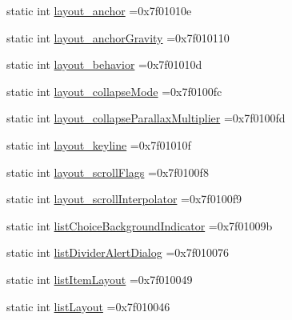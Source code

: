 \begin{DoxyCompactItemize}
\item 
static int \hyperlink{classandroid_1_1support_1_1graphics_1_1drawable_1_1animated_1_1R_1_1attr_a90a69ad17d119767331f4008913d0760}{layout\+\_\+anchor} =0x7f01010e
\item 
static int \hyperlink{classandroid_1_1support_1_1graphics_1_1drawable_1_1animated_1_1R_1_1attr_a21a34f7e65de6a6afbdcc5f751a1e730}{layout\+\_\+anchor\+Gravity} =0x7f010110
\item 
static int \hyperlink{classandroid_1_1support_1_1graphics_1_1drawable_1_1animated_1_1R_1_1attr_aca242dc21928e409955fbf7fc6e05b83}{layout\+\_\+behavior} =0x7f01010d
\item 
static int \hyperlink{classandroid_1_1support_1_1graphics_1_1drawable_1_1animated_1_1R_1_1attr_a310c79529b4bf2e08644eaf211b0722a}{layout\+\_\+collapse\+Mode} =0x7f0100fc
\item 
static int \hyperlink{classandroid_1_1support_1_1graphics_1_1drawable_1_1animated_1_1R_1_1attr_a6ed7dc564c15ce0ebec5738a97ac51ac}{layout\+\_\+collapse\+Parallax\+Multiplier} =0x7f0100fd
\item 
static int \hyperlink{classandroid_1_1support_1_1graphics_1_1drawable_1_1animated_1_1R_1_1attr_aaf0ae99d58d2849f0364907ea538790b}{layout\+\_\+keyline} =0x7f01010f
\item 
static int \hyperlink{classandroid_1_1support_1_1graphics_1_1drawable_1_1animated_1_1R_1_1attr_ac5528e3c81e8f85c2285fe0c10e601c9}{layout\+\_\+scroll\+Flags} =0x7f0100f8
\item 
static int \hyperlink{classandroid_1_1support_1_1graphics_1_1drawable_1_1animated_1_1R_1_1attr_a48bf8899070543d7f6838f8920058d8a}{layout\+\_\+scroll\+Interpolator} =0x7f0100f9
\item 
static int \hyperlink{classandroid_1_1support_1_1graphics_1_1drawable_1_1animated_1_1R_1_1attr_a850023a1ef98980f4fee11d4be91241e}{list\+Choice\+Background\+Indicator} =0x7f01009b
\item 
static int \hyperlink{classandroid_1_1support_1_1graphics_1_1drawable_1_1animated_1_1R_1_1attr_a9df9b037df3119731ea35fa5ae3e736f}{list\+Divider\+Alert\+Dialog} =0x7f010076
\item 
static int \hyperlink{classandroid_1_1support_1_1graphics_1_1drawable_1_1animated_1_1R_1_1attr_a1a90f77ae00d26c8c8c3fe2bba69f5b5}{list\+Item\+Layout} =0x7f010049
\item 
static int \hyperlink{classandroid_1_1support_1_1graphics_1_1drawable_1_1animated_1_1R_1_1attr_a4fceaa3d5b71546b7c3475308c2f201d}{list\+Layout} =0x7f010046
\item 

\end{DoxyCompactItemize}
